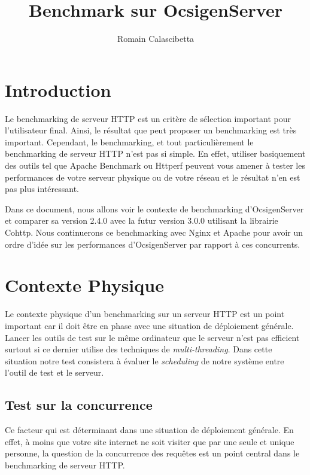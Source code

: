 \documentclass[a4paper, 11pt]{article}
\begin{document}
\title{Benchmark sur OcsigenServer}
\author{Romain Calascibetta}



\maketitle

\section{Introduction}

Le benchmarking de  serveur  HTTP  est  un  critère  de sélection important pour
l'utilisateur final.  Ainsi,  le résultat que  peut proposer un benchmarking est
très  important.   Cependant,  le  benchmarking,  et  tout  particulièrement  le
benchmarking  de  serveur  HTTP  n'est  pas  si  simple.   En  effet,   utiliser
basiquement des outils  tel que Apache Benchmark ou  Httperf peuvent vous amener
à tester  les performances de  votre serveur physique  ou de votre  réseau et le
résultat n'en est pas plus intéressant.

Dans ce document,  nous allons voir  le contexte de benchmarking d'OcsigenServer
et comparer sa version 2.4.0 avec  la futur version 3.0.0 utilisant la librairie
Cohttp.  Nous continuerons  ce benchmarking avec  Nginx et Apache  pour avoir un
ordre  d'idée   sur  les   performances  d'OcsigenServer   par  rapport   à  ces
concurrents.

\section{Contexte Physique}

Le  contexte  physique  d'un benchmarking  sur  un  serveur  HTTP  est  un point
important car il doit être en  phase avec une situation de déploiement générale.
Lancer les outils de  test  sur  le  même  ordinateur  que  le serveur n'est pas
efficient    surtout    si    ce    dernier    utilise    des    techniques   de
\emph{multi-threading}.  Dans cette situation notre test consistera à évaluer le
\emph{scheduling} de notre système entre l'outil de test et le serveur.

\subsection{Test sur la concurrence}

Ce facteur qui  est déterminant dans une situation  de déploiement générale.  En
effet,  à moins  que votre site  internet ne soit  visiter que par  une seule et
unique  personne,  la question  de la  concurrence  des  requêtes  est  un point
central dans le benchmarking de serveur HTTP.
\end{document}
